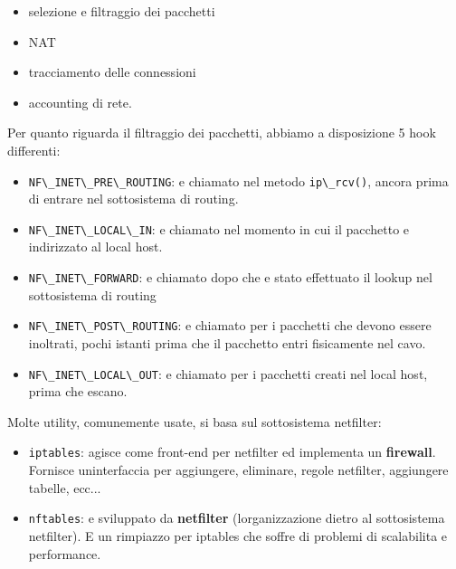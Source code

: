 \begin{itemize}
\tightlist
\item
  selezione e filtraggio dei pacchetti
\item
  NAT
\item
  tracciamento delle connessioni
\item
  accounting di rete.
\end{itemize}

Per quanto riguarda il filtraggio dei pacchetti, abbiamo a disposizione
5 hook differenti:

\begin{itemize}
\tightlist
\item
  \passthrough{\lstinline!NF\_INET\_PRE\_ROUTING!}: e\textquotesingle{}
  chiamato nel metodo \passthrough{\lstinline!ip\_rcv()!}, ancora prima
  di entrare nel sottosistema di routing.
\item
  \passthrough{\lstinline!NF\_INET\_LOCAL\_IN!}: e\textquotesingle{}
  chiamato nel momento in cui il pacchetto e\textquotesingle{}
  indirizzato al local host.
\item
  \passthrough{\lstinline!NF\_INET\_FORWARD!}: e\textquotesingle{}
  chiamato dopo che e\textquotesingle{} stato effettuato il lookup nel
  sottosistema di routing
\item
  \passthrough{\lstinline!NF\_INET\_POST\_ROUTING!}: e\textquotesingle{}
  chiamato per i pacchetti che devono essere inoltrati, pochi istanti
  prima che il pacchetto entri fisicamente nel cavo.
\item
  \passthrough{\lstinline!NF\_INET\_LOCAL\_OUT!}: e\textquotesingle{}
  chiamato per i pacchetti creati nel local host, prima che escano.
\end{itemize}

Molte utility, comunemente usate, si basa sul sottosistema netfilter:

\begin{itemize}
\tightlist
\item
  \passthrough{\lstinline!iptables!}: agisce come front-end per
  netfilter ed implementa un \textbf{firewall}. Fornisce
  un\textquotesingle interfaccia per aggiungere, eliminare, regole
  netfilter, aggiungere tabelle, ecc...
\item
  \passthrough{\lstinline!nftables!}: e\textquotesingle{} sviluppato da
  \textbf{netfilter} (l\textquotesingle organizzazione dietro al
  sottosistema netfilter). E\textquotesingle{} un rimpiazzo per iptables
  che soffre di problemi di scalabilita e performance.
\end{itemize}

